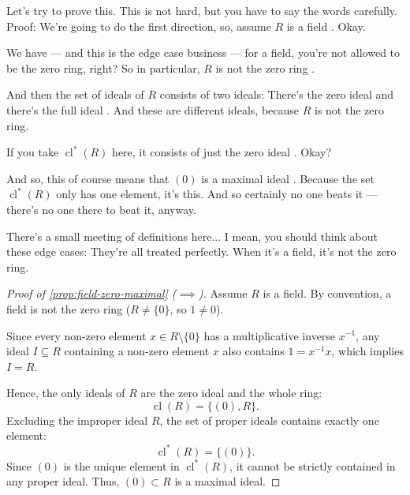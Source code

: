 \begin{speech}[00:13:28 - 00:14:48]
Let's try to prove this. This is not hard, but you have to say the words carefully. Proof: We're going to do the first direction, so, assume $R$ is a field . Okay.

We have --- and this is the edge case business --- for a field, you're not allowed to be the zero ring, right? So in particular, $R$ is not the zero ring .

And then the set of ideals of $R$ consists of two ideals: There's the zero ideal and there's the full ideal . And these are different ideals, because $R$ is not the zero ring.

If you take $\operatorname{cl}^*(R)$ here, it consists of just the zero ideal . Okay?

And so, this of course means that $(0)$ is a maximal ideal . Because the set $\operatorname{cl}^*(R)$ only has one element, it's this. And so certainly no one beats it --- there's no one there to beat it, anyway.

There's a small meeting of definitions here... I mean, you should think about these edge cases: They're all treated perfectly. When it's a field, it's not the zero ring.
\end{speech}

\begin{content}
\begin{proof}[Proof of \cref{prop:field-zero-maximal} ($\implies$)]
Assume $R$ is a field. By convention, a field is not the zero ring ($R \neq \{0\}$, so $1 \neq 0$).

Since every non-zero element $x \in R \setminus \{0\}$ has a multiplicative inverse $x^{-1}$, any ideal $I \subseteq R$ containing a non-zero element $x$ also contains $1 = x^{-1} x$, which implies $I = R$. 

Hence, the only ideals of $R$ are the zero ideal and the whole ring:
\begin{equation}\label{eq:field-ideals-w5}
\operatorname{cl}(R) = \{ (0), R \}.
\end{equation}
Excluding the improper ideal $R$, the set of proper ideals contains exactly one element:
\begin{equation}\label{eq:field-proper-ideals}
\operatorname{cl}^*(R) = \{ (0) \}.
\end{equation}
Since $(0)$ is the unique element in $\operatorname{cl}^*(R)$, it cannot be strictly contained in any proper ideal. Thus, $(0) \subset R$ is a maximal ideal.
\end{proof}
\end{content}


